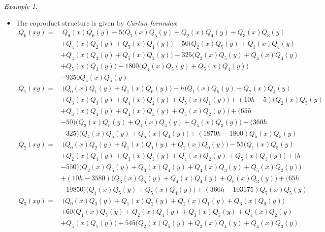 \documentclass{gtpart}
\theoremstyle{definition}
\theoremstyle{remark}
\newtheorem{ex}[equation]{Example}
\renewcommand{\=}{\approx}
\renewcommand{\-}{\sim}
\numberwithin{equation}{section}
\begin{document}
\begin{ex}
\begin{itemize}
  \item The coproduct structure is given by {\em Cartan formulas}: 
  \begin{equation*}
   \begin{split}
    Q_0(x y) = & ~ Q_0(x) Q_0(y) - 5 \big( Q_1(x) Q_5(y) + Q_2(x) Q_4(y) + Q_3(x) Q_3(y) \\
               & + Q_4(x) Q_2(y) + Q_5(x) Q_1(y) \big) - 50 \big( Q_2(x) Q_5(y) + Q_3(x) Q_4(y) \\
               & + Q_4(x) Q_3(y) + Q_5(x) Q_2(y) \big) - 325 \big( Q_3(x) Q_5(y) + Q_4(x) Q_4(y) \\
               & + Q_5(x) Q_3(y) \big) - 1800 \big( Q_4(x) Q_5(y) + Q_5(x) Q_4(y) \big) \\
               & - 9350 Q_5(x) Q_5(y) \\
    Q_1(x y) = & ~ \big( Q_0(x) Q_1(y) + Q_1(x) Q_0(y) \big) + h \big( Q_1(x) Q_5(y) + Q_2(x) Q_4(y) \\
               & + Q_3(x) Q_3(y) + Q_4(x) Q_2(y) + Q_5(x) Q_1(y) \big) + (10 h - 5) \big( Q_2(x) Q_5(y) \\
               & + Q_3(x) Q_4(y) + Q_4(x) Q_3(y) + Q_5(x) Q_2(y) \big) + (65 h \\
               & - 50) \big( Q_3(x) Q_5(y) + Q_4(x) Q_4(y) + Q_5(x) Q_3(y) \big) + (360 h \\
               & - 325) \big( Q_4(x) Q_5(y) + Q_5(x) Q_4(y) \big) + (1870 h - 1800) Q_5(x) Q_5(y) \\
    Q_2(x y) = & ~ \big( Q_0(x) Q_2(y) + Q_1(x) Q_1(y) + Q_2(x) Q_0(y) \big) - 55 \big( Q_1(x) Q_5(y) \\
               & + Q_2(x) Q_4(y) + Q_3(x) Q_3(y) + Q_4(x) Q_2(y) + Q_5(x) Q_1(y) \big) + (h \\
               & - 550) \big( Q_2(x) Q_5(y) + Q_3(x) Q_4(y) + Q_4(x) Q_3(y) + Q_5(x) Q_2(y) \big) \\
               & + (10 h - 3580) \big( Q_3(x) Q_5(y) + Q_4(x) Q_4(y) + Q_5(x) Q_3(y) \big) + (65 h \\
               & - 19850) \big( Q_4(x) Q_5(y) + Q_5(x) Q_4(y) \big) + (360 h - 103175) Q_5(x) Q_5(y) \\
    Q_3(x y) = & ~ \big( Q_0(x) Q_3(y) + Q_1(x) Q_2(y) + Q_2(x) Q_1(y) + Q_3(x) Q_0(y) \big) \\
               & + 60 \big( Q_1(x) Q_5(y) + Q_2(x) Q_4(y) + Q_3(x) Q_3(y) + Q_4(x) Q_2(y) \\
               & + Q_5(x) Q_1(y) \big) + 545 \big( Q_2(x) Q_5(y) + Q_3(x) Q_4(y) + Q_4(x) Q_3(y) \\

\end{split}
\end{equation*}
\end{itemize}
\end{ex}
\end{document}
